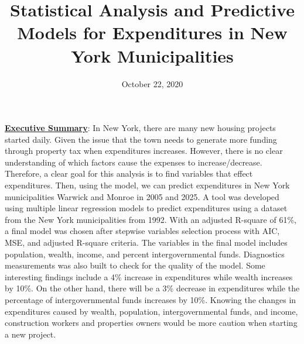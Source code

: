 \documentclass[11pt]{article}\usepackage[]{graphicx}\usepackage[]{color}
\title{Statistical Analysis and Predictive Models for Expenditures in New York Municipalities\vspace{-5ex}}
\date{October 22, 2020\vspace{-5ex}}
\begin{document}
 
\maketitle
\hfill \break










\noindent\textbf{\underline{Executive Summary}}: In New York, there are many new housing projects started daily. Given the issue that the town needs to generate more funding through property tax when expenditures increases. However, there is no clear understanding of which factors cause the expenses to increase/decrease. Therefore, a clear goal for this analysis is to find variables that effect expenditures. Then, using the model, we can predict expenditures in New York municipalities Warwick and Monroe in 2005 and 2025. A tool was developed using multiple linear regression models to predict expenditures using a dataset from the New York municipalities from 1992. With an adjusted R-square of 61\%, a final model was chosen after stepwise variables selection process with AIC, MSE, and adjusted R-square criteria. The variables in the final model includes population, wealth, income, and percent intergovernmental funds. Diagnostics measurements was also built to check for the quality of the model. Some interesting findings include a 4\% increase in expenditures while wealth increases by 10\%. On the other hand, there will be a 3\% decrease in expenditures while the percentage of intergovernmental funds increases by 10\%. Knowing the changes in expenditures caused by wealth, population, intergovernmental funds, and income, construction workers and properties owners would be more caution when starting a new project.            
\hfill \break
\end{document}
